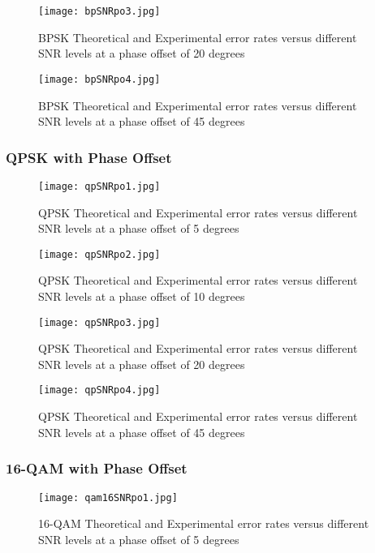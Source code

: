 \documentclass[]{article}
\begin{document}
\begin{figure}[H]
\centering
\hspace*{-2cm}\texttt{[image: bpSNRpo3.jpg]}
\caption{BPSK Theoretical and Experimental error rates versus different SNR levels at a phase offset of 20 degrees }
\end{figure}

\begin{figure}[H]
\centering
\hspace*{-2cm}\texttt{[image: bpSNRpo4.jpg]}
\caption{BPSK Theoretical and Experimental error rates versus different SNR levels at a phase offset of 45 degrees }
\end{figure}


\subsubsection{QPSK with Phase Offset}
\label{sec:qpsk_phase}
\begin{figure}[H]
\centering
\hspace*{-2cm}\texttt{[image: qpSNRpo1.jpg]}
\caption{QPSK Theoretical and Experimental error rates versus different SNR levels at a phase offset of 5 degrees }
\end{figure}

\begin{figure}[H]
\centering
\hspace*{-2cm}\texttt{[image: qpSNRpo2.jpg]}
\caption{QPSK Theoretical and Experimental error rates versus different SNR levels at a phase offset of 10 degrees }
\end{figure}

\begin{figure}[H]
\centering
\hspace*{-2cm}\texttt{[image: qpSNRpo3.jpg]}
\caption{QPSK Theoretical and Experimental error rates versus different SNR levels at a phase offset of 20 degrees }
\end{figure}

\begin{figure}[H]
\centering
\hspace*{-2cm}\texttt{[image: qpSNRpo4.jpg]}
\caption{QPSK Theoretical and Experimental error rates versus different SNR levels at a phase offset of 45 degrees }
\end{figure}


\subsubsection{16-QAM with Phase Offset}
\label{sec:qam16_phase}
\begin{figure}[H]
\centering
\hspace*{-2cm}\texttt{[image: qam16SNRpo1.jpg]}
\caption{16-QAM Theoretical and Experimental error rates versus different SNR levels at a phase offset of 5 degrees }
\end{figure}
\end{document}
